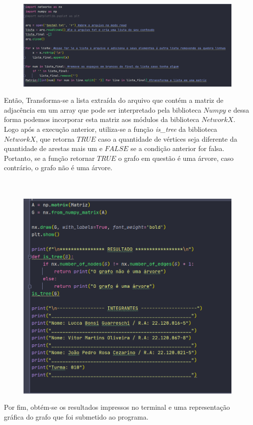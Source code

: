\documentclass{article}
\begin{document}
		\begin{figure}[H]
			\centering
			\includegraphics[width=0.7\linewidth]{"Figuras/print1"}
			\label{fig:print1}
			\caption{}
		\end{figure}\vspace*{0.2cm}

 		Então, Transforma-se a lista extraída do arquivo que contém a matriz de adjacência em um array que pode ser interpretado pela biblioteca $Numpy$ e dessa forma podemos incorporar esta matriz aos módulos da biblioteca $NetworkX$.\\
 		
 		Logo após a execução anterior, utiliza-se a função \textit{is\_tree} da biblioteca $NetworkX$, que retorna $TRUE$ caso a quantidade de vértices seja diferente da quantidade de arestas mais um e $FALSE$ se a condição anterior for falsa. Portanto, se a função retornar $TRUE$ o grafo em questão é uma árvore, caso contrário, o grafo não é uma árvore.\\
 		\\
 		\\
 		\begin{figure}[H]
 			\centering
 			\includegraphics[width=0.5\linewidth]{"Figuras/print2"}
 			\label{fig:print2}
 			\caption{}
 		\end{figure}\vspace*{0.2cm}
 		
 		Por fim, obtém-se os resultados impressos no terminal e uma representação gráfica do grafo que foi submetido ao programa.
 		
\end{document}
